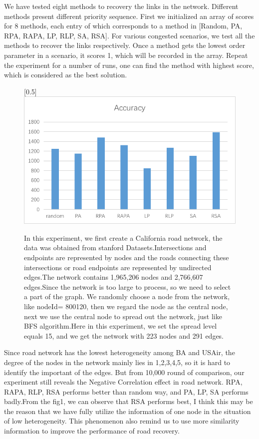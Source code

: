 \documentclass[onecolumn,preprintnumbers,amsmath,amssymb]{revtex4}
\begin{document}

We have tested eight methods to recovery the links in the network. Different methods present different priority sequence. 
First we initialized an array of scores for 8 methods, each entry of which corresponds to a method in [Random, PA, RPA, RAPA, LP, RLP, SA, RSA]. 
For various congested scenarios, we test all the methods to recover the links respectively.
Once a method gets the lowest order parameter in a scenario, it scores 1, which will be recorded in the array.
Repeat the experiment for a number of runs, one can find the method with highest score, which is considered as the best solution.


\begin{figure}[ht]
\scalebox{0.5}[0.5]{\includegraphics[trim=0 10 0 0]{road.png}}
\caption{In this experiment, we first create a California road network, the data was obtained from stanford Datasets.Intersections and endpoints are represented by nodes and the roads connecting these intersections or road endpoints are represented by undirected edges.The network contains 1,965,206	 nodes and 2,766,607 edges.Since the network is too large to process, so we need to select a part of the graph. We randomly choose a node from the network, like nodeId= 800120, then we regard the node as the central node, next we use the central node to spread out the network, just like BFS algorithm.Here in this experiment, we set the spread level equals 15, and we get the network with 223 nodes and 291 edges.}\label{BAZD}
\end{figure}

Since road network has the lowest heterogeneity among BA and USAir, the degree of the nodes in the network mainly lies in 1,2,3,4,5, so it is hard to identify the important of the edges. But from 10,000 round of comparison, our experiment still reveals the Negative Correlation effect in road network. RPA, RAPA, RLP, RSA performs better than random way, and PA, LP, SA performs badly.From the fig1, we can observe that RSA performs best, I think this may be the reason that we have fully utilize the information of one node in the situation of low heterogeneity. This phenomenon also remind us to use more similarity information to improve the performance of road recovery. 
\end{document}
